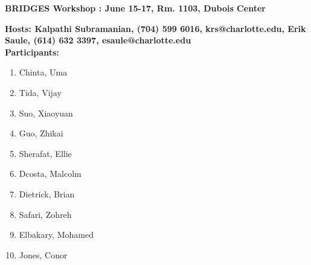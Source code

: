 \documentclass[12pt, onecoulmn]{article}
\begin{document}
\begin{center}
\textbf{\Large BRIDGES Workshop : June 15-17, Rm. 1103, Dubois Center}
\end{center}
\textbf{Hosts: Kalpathi Subramanian, (704) 599 6016, krs@charlotte.edu, 
Erik Saule, (614) 632 3397, esaule@charlotte.edu} \\

\textbf{Participants:}
\begin{enumerate}
\item Chinta, Uma
\item Tida, Vijay
\item Suo, Xiaoyuan
\item Guo, Zhikai
\item Sherafat, Ellie
\item Dcosta, Malcolm
\item Dietrick, Brian
\item Safari, Zohreh
\item Elbakary, Mohamed
\item Jones, Conor
\end{enumerate}
\end{document}
